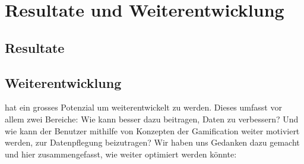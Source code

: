 \chapter{Resultate und Weiterentwicklung}
\label{pd-resultate}

\section{Resultate}

\section{Weiterentwicklung}

\kort{} hat ein grosses Potenzial um weiterentwickelt zu werden.
Dieses umfasst vor allem zwei Bereiche:
Wie kann \kort{} besser dazu beitragen,  Daten zu verbessern?
Und wie kann der Benutzer mithilfe von Konzepten der Gamification weiter motiviert werden, zur Datenpflegung beizutragen?\newline
Wir haben uns Gedanken dazu gemacht und hier zusammengefasst, wie \kort{} weiter optimiert werden könnte:
